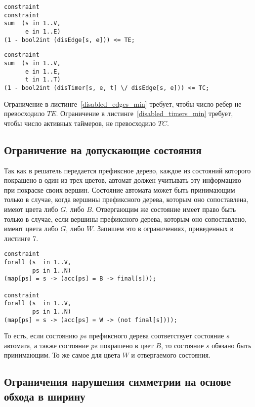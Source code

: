 \documentclass[times,specification,annotation]{itmo-student-thesis}
\begin{document}
\begin{lstlisting}[float=!h,language=Mzn,caption={Ограничение на верхнюю границу числа ребер},label={disabled_edges_min}]
constraint
constraint
sum  (s in 1..V,
      e in 1..E)
(1 - bool2int (disEdge[s, e])) <= TE;
\end{lstlisting}

\begin{lstlisting}[float=!h,language=Mzn,caption={Ограничение на верхнюю границу числа активных таймеров},label={disabled_timers_min}]
constraint
sum  (s in 1..V,
      e in 1..E,
      t in 1..T)
(1 - bool2int (disTimer[s, e, t] \/ disEdge[s, e])) <= TC;
\end{lstlisting}

Ограничение в листинге~\ref{disabled_edges_min} требует, чтобы число ребер не превосходило $TE$.
Ограничение в листинге~\ref{disabled_timers_min} требует, чтобы число активных таймеров, не превосходило $TC$.

\subsection{Ограничение на допускающие состояния}

Так как в решатель передается префиксное дерево, каждое из состояний которого покрашено в один из трех цветов, автомат должен учитывать эту информацию при покраске своих вершин.
Состояние автомата может быть принимающим только в случае, когда вершины префиксного дерева, которым оно сопоставлена, имеют цвета либо $G$, либо $B$. Отвергающим же состояние имеет право
быть только в случае, если вершины префиксного дерева, которым оно сопоставлено, имеют цвета либо $G$, либо $W$. Запишем это в ограничениях, приведенных в листинге 7.

\begin{lstlisting}[float=!h,language=Mzn,caption={Ограничения на допускающие состояния},label={term}]
constraint
forall (s  in 1..V,
        ps in 1..N)
(map[ps] = s -> (acc[ps] = B -> final[s]));

constraint
forall (s  in 1..V,
        ps in 1..N)
(map[ps] = s -> (acc[ps] = W -> (not final[s])));
\end{lstlisting}

То есть, если состоянию $ps$ префиксного дерева соответствует состояние $s$ автомата, а также состояние $ps$ покрашено в цвет $B$, то состояние $s$ обязано быть принимающим. То же
самое для цвета $W$ и отвергаемого состояния.

\subsection{Ограничения нарушения симметрии на основе обхода в ширину}
\end{document}
